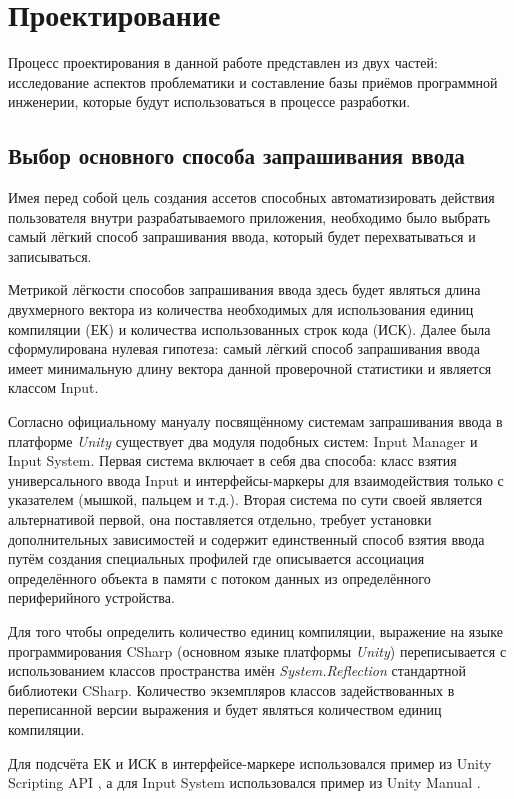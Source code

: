 \chapter{Проектирование}
\label{cha:ch_1}

Процесс проектирования в данной работе представлен из двух частей: исследование аспектов проблематики и составление базы приёмов программной инженерии, которые будут использоваться в процессе разработки.

\section{Выбор основного способа запрашивания ввода}
Имея перед собой цель создания ассетов способных автоматизировать действия пользователя внутри разрабатываемого приложения, необходимо было выбрать самый лёгкий способ запрашивания ввода, который будет перехватываться и записываться.

Метрикой лёгкости способов запрашивания ввода здесь будет являться длина двухмерного вектора из количества необходимых для использования единиц компиляции (ЕК) и количества использованных строк кода	 (ИСК). Далее была сформулирована нулевая гипотеза: самый лёгкий способ запрашивания ввода имеет минимальную длину вектора данной проверочной статистики и является классом Input.

Согласно официальному мануалу посвящённому системам запрашивания ввода \cite{unity_input_systems} в платформе \textit{Unity} существует два модуля подобных систем: Input Manager и Input System. Первая система включает в себя два способа: класс взятия универсального ввода Input и интерфейсы-маркеры для взаимодействия только с указателем (мышкой, пальцем и т.д.). Вторая система по сути своей является альтернативой первой, она поставляется отдельно, требует установки дополнительных зависимостей и содержит единственный способ взятия ввода путём создания специальных профилей где описывается ассоциация определённого объекта в памяти с потоком данных из определённого периферийного устройства.

Для того чтобы определить количество единиц компиляции, выражение на языке программирования CSharp (основном языке платформы \textit{Unity}) переписывается с использованием классов пространства имён \textit{System.Reflection} стандартной библиотеки CSharp. Количество экземпляров классов задействованных в переписанной версии выражения и будет являться количеством единиц компиляции.

Для подсчёта ЕК и ИСК в интерфейсе-маркере использовался пример из Unity Scripting API \cite{unity_interface}, а для Input System использовался пример из Unity Manual \cite{unity_is}.

